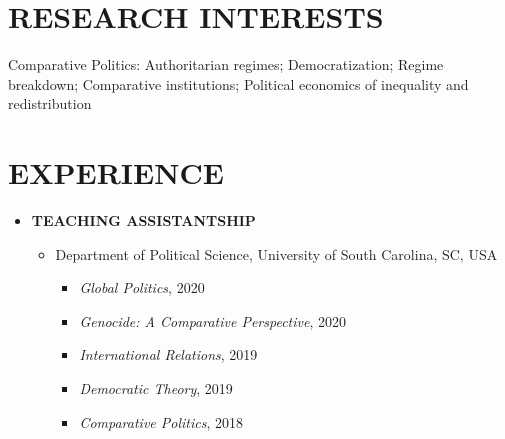 \documentclass[11pt]{res} %
\begin{document}
\begin{resume}
\section{RESEARCH INTERESTS}
Comparative Politics: Authoritarian regimes; Democratization; Regime breakdown; Comparative institutions; Political economics of inequality and redistribution

\section{EXPERIENCE}
\begin{itemize}[leftmargin=*]
	\item[] \textbf{TEACHING ASSISTANTSHIP}
	 \begin{itemize}[leftmargin=*]
		\item[] Department of Political Science, University of South Carolina, SC, USA
		\begin{itemize}[leftmargin=*]
			\setlength\itemsep{-0.2em}
			\item[] \textit{Global Politics}, 2020
			\item[] \textit{Genocide: A Comparative Perspective}, 2020
			\item[] \textit{International Relations}, 2019
			\item[] \textit{Democratic Theory}, 2019
			\item[] \textit{Comparative Politics}, 2018
		\end{itemize}
		

\end{itemize}
\end{itemize}
\end{resume}
\end{document}

